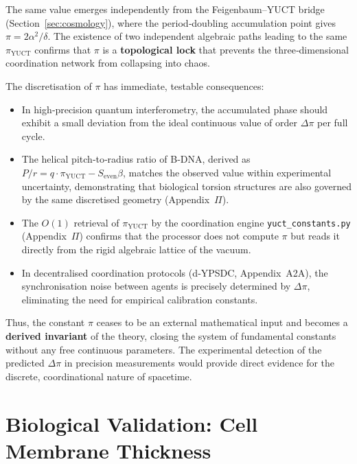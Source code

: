 \documentclass[12pt,a4paper]{article}
\theoremstyle{remark}
\begin{document}
	The same value emerges independently from the Feigenbaum–YUCT bridge
	(Section~\ref{sec:cosmology}), where the period‑doubling accumulation point
	gives \(\pi = 2\alpha^2/\delta\).  The existence of two independent algebraic
	paths leading to the same \(\pi_{\mathrm{YUCT}}\) confirms that \(\pi\) is a
	\textbf{topological lock} that prevents the three‑dimensional coordination
	network from collapsing into chaos.
	
	The discretisation of \(\pi\) has immediate, testable consequences:
	\begin{itemize}
		\item In high‑precision quantum interferometry, the accumulated phase
		should exhibit a small deviation from the ideal continuous value
		of order \(\Delta\pi\) per full cycle.
		\item The helical pitch‑to‑radius ratio of B‑DNA, derived as
		\(P/r = q\cdot\pi_{\mathrm{YUCT}} - S_{\mathrm{even}}\beta\),
		matches the observed value within experimental uncertainty,
		demonstrating that biological torsion structures are also
		governed by the same discretised geometry (Appendix~\(\Pi\)).
		\item The \(O(1)\) retrieval of \(\pi_{\mathrm{YUCT}}\) by the
		coordination engine \texttt{yuct\_constants.py} (Appendix~\(\Pi\))
		confirms that the processor does not compute \(\pi\) but reads it
		directly from the rigid algebraic lattice of the vacuum.
		\item In decentralised coordination protocols (d‑YPSDC, Appendix~A2A),
		the synchronisation noise between agents is precisely determined
		by \(\Delta\pi\), eliminating the need for empirical calibration
		constants.
	\end{itemize}
	
	Thus, the constant \(\pi\) ceases to be an external mathematical input and
	becomes a \textbf{derived invariant} of the theory, closing the system of
	fundamental constants without any free continuous parameters.  The experimental
	detection of the predicted \(\Delta\pi\) in precision measurements would
	provide direct evidence for the discrete, coordinational nature of spacetime.
	
	\section{Biological Validation: Cell Membrane Thickness}
	\label{sec:bio-membrane}
	
\end{document}
